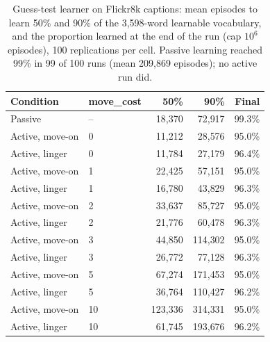 \documentclass[a4paper,natbib,man]{apa6}
\begin{document}
\begin{table}[h]
\centering
\caption{\label{tab-flickr-gt} Guess-test learner on Flickr8k captions: mean episodes to learn 50\% and 90\% of the 3,598-word learnable vocabulary, and the proportion learned at the end of the run (cap $10^6$ episodes), 100 replications per cell. Passive learning reached 99\% in 99 of 100 runs (mean 209,869 episodes); no active run did.}
\small
\begin{tabular}{llrrr}
\hline
Condition & move\_cost & 50\% & 90\% & Final \\
\hline
Passive        & --  & 18{,}370 & 72{,}917 & 99.3\% \\
Active, move-on & 0  & 11{,}212 & 28{,}576 & 95.0\% \\
Active, linger  & 0  & 11{,}784 & 27{,}179 & 96.4\% \\
Active, move-on & 1  & 22{,}425 & 57{,}151 & 95.0\% \\
Active, linger  & 1  & 16{,}780 & 43{,}829 & 96.3\% \\
Active, move-on & 2  & 33{,}637 & 85{,}727 & 95.0\% \\
Active, linger  & 2  & 21{,}776 & 60{,}478 & 96.3\% \\
Active, move-on & 3  & 44{,}850 & 114{,}302 & 95.0\% \\
Active, linger  & 3  & 26{,}772 & 77{,}128 & 96.3\% \\
Active, move-on & 5  & 67{,}274 & 171{,}453 & 95.0\% \\
Active, linger  & 5  & 36{,}764 & 110{,}427 & 96.2\% \\
Active, move-on & 10 & 123{,}336 & 314{,}331 & 95.0\% \\
Active, linger  & 10 & 61{,}745 & 193{,}676 & 96.2\% \\
\hline
\end{tabular}
\end{table}
\end{document}
